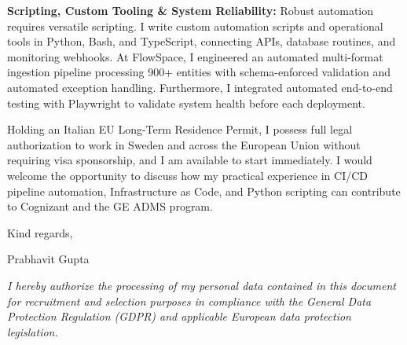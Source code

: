 \documentclass[11pt,a4paper]{article}
\begin{document}
\textbf{Scripting, Custom Tooling \& System Reliability:} Robust automation requires versatile scripting. I write custom automation scripts and operational tools in Python, Bash, and TypeScript, connecting APIs, database routines, and monitoring webhooks. At FlowSpace, I engineered an automated multi-format ingestion pipeline processing 900+ entities with schema-enforced validation and automated exception handling. Furthermore, I integrated automated end-to-end testing with Playwright to validate system health before each deployment.

Holding an Italian EU Long-Term Residence Permit, I possess full legal authorization to work in Sweden and across the European Union without requiring visa sponsorship, and I am available to start immediately. I would welcome the opportunity to discuss how my practical experience in CI/CD pipeline automation, Infrastructure as Code, and Python scripting can contribute to Cognizant and the GE ADMS program.

Kind regards,

Prabhavit Gupta

\vspace{0.4em}
{\footnotesize \textit{I hereby authorize the processing of my personal data contained in this document for recruitment and selection purposes in compliance with the General Data Protection Regulation (GDPR) and applicable European data protection legislation.}\par}
\end{document}
